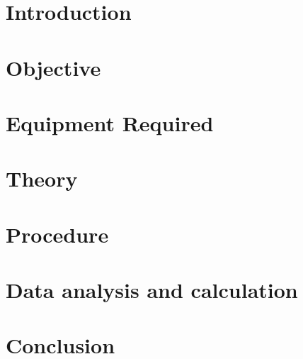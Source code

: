 
\renewcommand{\arraystretch}{1.5} %

\section{Introduction}
\section{Objective}
\section{Equipment Required}
\section{Theory}
\section{Procedure}
\section{Data analysis and calculation} 
\section{Conclusion}

